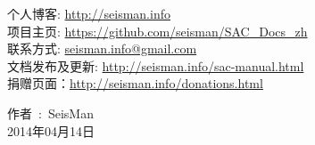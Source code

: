 \begin{flushleft}
个人博客: \url{http://seisman.info}                         \\
项目主页: \url{https://github.com/seisman/SAC_Docs_zh}      \\
联系方式: \url{seisman.info@gmail.com}                      \\
文档发布及更新: \url{http://seisman.info/sac-manual.html}   \\
捐赠页面：\url{http://seisman.info/donations.html}          \\

\end{flushleft}

\begin{flushright}
作者~:~SeisMan \\
2014年04月14日
\end{flushright}
